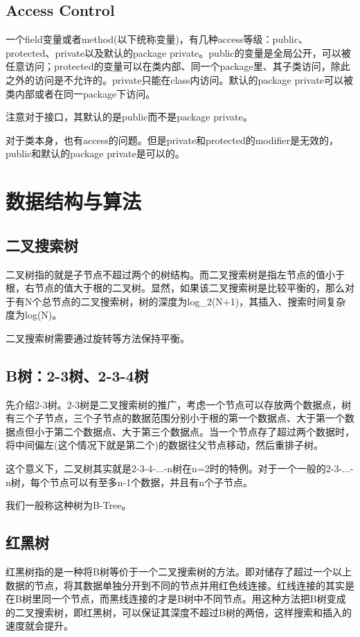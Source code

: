 \documentclass{article}
\begin{document}
	\subsection{Access Control}
	一个field变量或者method(以下统称变量)，有几种access等级：public、protected、private以及默认的package private。public的变量是全局公开，可以被任意访问；protected的变量可以在类内部、同一个package里、其子类访问，除此之外的访问是不允许的。private只能在class内访问。默认的package private可以被类内部或者在同一package下访问。
	
	注意对于接口，其默认的是public而不是package private。
	
	对于类本身，也有access的问题。但是private和protected的modifier是无效的，public和默认的package private是可以的。
	
	\section{数据结构与算法}
	\subsection{二叉搜索树}
	二叉树指的就是子节点不超过两个的树结构。而二叉搜索树是指左节点的值小于根，右节点的值大于根的二叉树。显然，如果该二叉搜索树是比较平衡的，那么对于有N个总节点的二叉搜索树，树的深度为log\_2(N+1)，其插入、搜索时间复杂度为log(N)。
	
	二叉搜索树需要通过旋转等方法保持平衡。
	\subsection{B树：2-3树、2-3-4树}
	先介绍2-3树。2-3树是二叉搜索树的推广，考虑一个节点可以存放两个数据点，树有三个子节点，三个子节点的数据范围分别小于根的第一个数据点、大于第一个数据点但小于第二个数据点、大于第三个数据点。当一个节点存了超过两个数据时，将中间偏左(这个情况下就是第二个)的数据往父节点移动，然后重排子树。
	
	这个意义下，二叉树其实就是2-3-4-...-n树在n=2时的特例。对于一个一般的2-3-...-n树，每个节点可以有至多n-1个数据，并且有n个子节点。
	
	我们一般称这种树为B-Tree。
	
	\subsection{红黑树}
	红黑树指的是一种将B树等价于一个二叉搜索树的方法。即对储存了超过一个以上数据的节点，将其数据单独分开到不同的节点并用红色线连接。红线连接的其实是在B树里同一个节点，而黑线连接的才是B树中不同节点。用这种方法把B树变成的二叉搜索树，即红黑树，可以保证其深度不超过B树的两倍，这样搜索和插入的速度就会提升。
\end{document}
